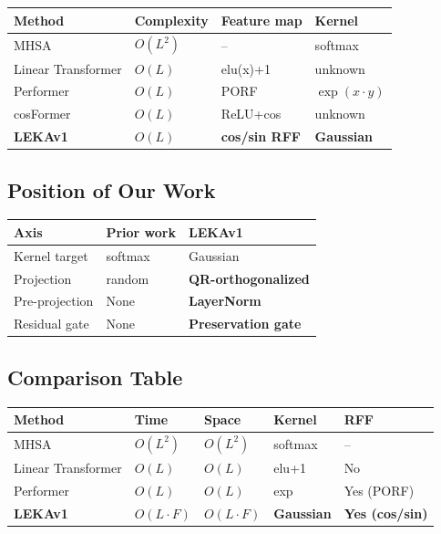 \begin{table}[H]
\centering
\small
\begin{tabular}{llll}
\toprule
\textbf{Method} & \textbf{Complexity} & \textbf{Feature map} & \textbf{Kernel} \\
\midrule
MHSA & $O(L^2)$ & -- & softmax \\
Linear Transformer & $O(L)$ & elu(x)+1 & unknown \\
Performer & $O(L)$ & PORF & $\exp(x \cdot y)$ \\
cosFormer & $O(L)$ & ReLU+cos & unknown \\
\textbf{LEKAv1} & $O(L)$ & \textbf{cos/sin RFF} & \textbf{Gaussian} \\
\bottomrule
\end{tabular}
\end{table}

\subsection{Position of Our Work}

\begin{table}[H]
\centering
\small
\begin{tabular}{lll}
\toprule
\textbf{Axis} & \textbf{Prior work} & \textbf{LEKAv1} \\
\midrule
Kernel target & softmax & Gaussian \\
Projection & random & \textbf{QR-orthogonalized} \\
Pre-projection & None & \textbf{LayerNorm} \\
Residual gate & None & \textbf{Preservation gate} \\
\bottomrule
\end{tabular}
\end{table}



\subsection{Comparison Table}

\begin{table}[H]
\centering
\small
\begin{tabular}{lllll}
\toprule
\textbf{Method} & \textbf{Time} & \textbf{Space} & \textbf{Kernel} & \textbf{RFF} \\
\midrule
MHSA & $O(L^2)$ & $O(L^2)$ & softmax & -- \\
Linear Transformer & $O(L)$ & $O(L)$ & elu+1 & No \\
Performer & $O(L)$ & $O(L)$ & exp & Yes (PORF) \\
\textbf{LEKAv1} & $O(L \cdot F)$ & $O(L \cdot F)$ & \textbf{Gaussian} & \textbf{Yes (cos/sin)} \\
\bottomrule
\end{tabular}
\end{table}



